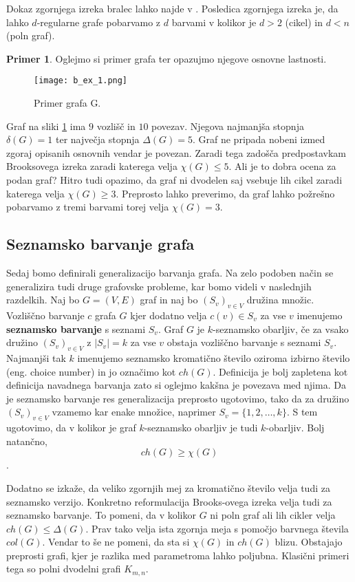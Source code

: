 \documentclass[12pt,a4paper,twoside]{article}
\theoremstyle{definition} %
\newtheorem{primer}[definicija]{Primer}
\theoremstyle{plain} %
\numberwithin{equation}{section}  %
\begin{document}
Dokaz zgornjega izreka bralec lahko najde v \cite{maingraph}. Posledica zgornjega izreka je, da lahko $d$-regularne grafe pobarvamo z $d$ barvami v kolikor je $d> 2$ (cikel) in $d < n$ (poln graf).

\begin{primer}
Oglejmo si primer grafa ter opazujmo njegove osnovne lastnosti.
 \begin{figure}[h!]
\caption{Primer grafa G.}
\label{basic_ex}
\centering
    \texttt{[image: b\_ex\_1.png]}
    \end{figure}
Graf na sliki \ref{basic_ex} ima $9$ vozlišč in $10$ povezav. Njegova najmanjša stopnja $\delta(G) = 1$ ter največja stopnja $\Delta(G) = 5$. Graf ne pripada nobeni izmed zgoraj opisanih osnovnih vendar je povezan. Zaradi tega zadošča predpostavkam Brooksovega izreka zaradi katerega velja $\chi(G) \le 5$. Ali je to dobra ocena za podan graf? Hitro tudi opazimo, da graf ni dvodelen saj vsebuje lih cikel zaradi katerega velja $\chi(G) \ge 3$. Preprosto lahko preverimo, da graf lahko požrešno pobarvamo z tremi barvami torej velja $\chi(G) = 3$.
\end{primer}

\subsection{Seznamsko barvanje grafa}
Sedaj bomo definirali generalizacijo barvanja grafa. Na zelo podoben način se generalizira tudi druge grafovske probleme, kar bomo videli v naslednjih razdelkih. Naj bo $G = (V, E)$ graf in naj bo $(S_v)_{v \in V}$ družina množic. Vozliščno barvanje $c$ grafa $G$ kjer dodatno velja $c(v) \in S_v$ za vse $v$ imenujemo \textbf{seznamsko barvanje} s seznami $S_v$. Graf $G$ je $k$-seznamsko obarljiv, če za vsako družino  $(S_v)_{v \in V}$ z $|S_v| = k$ za vse $v$ obstaja vozliščno barvanje s seznami $S_v$. Najmanjši tak $k$ imenujemo seznamsko kromatično število oziroma izbirno število (eng. choice number) in jo označimo kot $ch(G)$.
Definicija je bolj zapletena kot definicija navadnega barvanja zato si oglejmo kakšna je povezava med njima. Da je seznamsko barvanje res generalizacija preprosto ugotovimo, tako da za družino  $(S_v)_{v \in V}$ vzamemo kar enake množice, naprimer $S_v = \{1,2, \ldots, k\}$.  S tem ugotovimo, da v kolikor je graf $k$-seznamsko obarljiv je tudi $k$-obarljiv. Bolj natančno, 
$$ ch(G) \ge \chi(G)$$.

Dodatno se izkaže, da veliko zgornjih mej za kromatično število velja tudi za seznamsko verzijo. Konkretno reformulacija Brooks-ovega izreka velja tudi za seznamsko barvanje. To pomeni, da v kolikor $G$ ni poln graf ali lih cikler velja $ch(G) \le \Delta(G)$.  Prav tako velja ista zgornja meja s pomočjo barvnega števila $col(G)$. Vendar to še ne pomeni, da sta si $\chi(G)$ in $ch(G)$ blizu. Obstajajo preprosti grafi, kjer je razlika med parametroma lahko poljubna. Klasični primeri tega so polni dvodelni grafi $K_{m,n}$.
\end{document}
